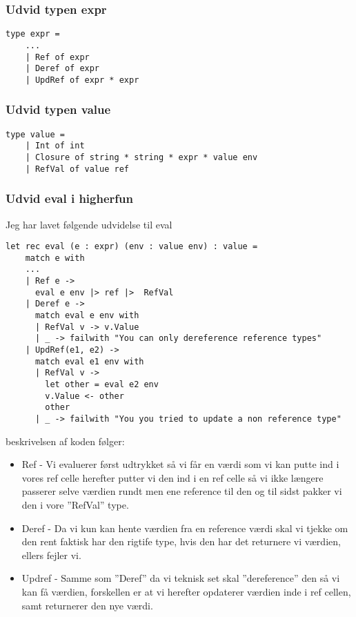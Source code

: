 \subsubsection{Udvid typen expr}
\begin{lstlisting}[style=fsharp]
type expr = 
    ...
    | Ref of expr
    | Deref of expr
    | UpdRef of expr * expr
\end{lstlisting}
\subsubsection{Udvid typen value}
\begin{lstlisting}[style=fsharp]
type value = 
    | Int of int
    | Closure of string * string * expr * value env
    | RefVal of value ref
\end{lstlisting}
\newpage
\subsubsection{Udvid eval i higherfun}
Jeg har lavet følgende udvidelse til eval
\begin{lstlisting}[style=fsharp]
let rec eval (e : expr) (env : value env) : value =
    match e with
    ...
    | Ref e -> 
      eval e env |> ref |>  RefVal
    | Deref e -> 
      match eval e env with
      | RefVal v -> v.Value
      | _ -> failwith "You can only dereference reference types"
    | UpdRef(e1, e2) ->
      match eval e1 env with
      | RefVal v -> 
        let other = eval e2 env
        v.Value <- other
        other
      | _ -> failwith "You you tried to update a non reference type"
\end{lstlisting}
beskrivelsen af koden følger:
\begin{itemize}
    \item Ref - Vi evaluerer først udtrykket så vi får en værdi som vi kan putte ind i vores ref celle herefter putter vi den ind i en ref celle så vi ikke længere passerer selve værdien rundt men ene reference til den og til sidst pakker vi den i vore ''RefVal'' type.
    \item Deref - Da vi kun kan hente værdien fra en reference værdi skal vi tjekke om den rent faktisk har den rigtife type, hvis den har det returnere vi værdien, ellers fejler vi.
    \item Updref - Samme som ''Deref'' da vi teknisk set skal ''dereference'' den så vi kan få værdien, forskellen er at vi herefter opdaterer værdien inde i ref cellen, samt returnerer den nye værdi.
\end{itemize}
